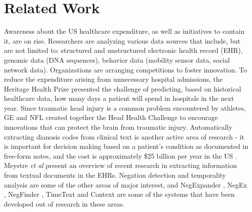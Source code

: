 \section{Related Work}
\label{sec:related}
Awareness about the US healthcare expenditure, as well as initiatives to contain it, are on rise. Researchers are analyzing various data sources that include, but are not limited to: structured and unstructured electronic health record (EHR), genomic data (DNA sequences), behavior data (mobility sensor data, social network data). Organizations are arranging competitions to foster innovation. To reduce the expenditure arising from unnecessary hospital admissions, the Heritage Health Prize \cite{hhp} presented the challenge of predicting, based on historical healthcare data, how many days a patient will spend in hospitals in the next year. Since traumatic head injury is a common problem encountered by athletes, GE and NFL created together the Head Health Challenge \cite{hhc} to encourage innovations that can protect the brain from traumatic injury. Automatically extracting dianosis codes from clinical text is another active area of research - it is important for decision making based on a patient's condition as documented in free-form notes, and the cost is approximately \$25 billion per year in the US \cite{siam-health}. Meystre {\em et al} \cite{MSKH08} present an overview of recent research in extracting information from textual documents in the EHRs. Negation detection and temporality analysis are some of the other areas of major interest, and NegExpander \cite{AFC99}, NegEx \cite{Chapman01}, NegFinder \cite{MDN01}, TimeText \cite{ZPH07} and Context \cite{CCD07} are some of the systems that have been developed out of research in these areas.

